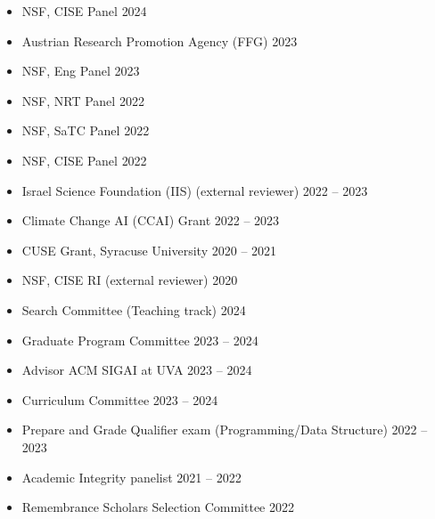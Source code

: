 \begin{itemize}
  \item 
  NSF, CISE Panel \hfill {2024} %
  \item 
  Austrian Research Promotion Agency (FFG) \hfill {2023}
  \item 
  NSF, Eng Panel \hfill {2023}
  \item 
  NSF, NRT Panel \hfill {2022}
  \item 
  NSF, SaTC Panel \hfill {2022} %
  \item 
  NSF, CISE Panel \hfill {2022} %
  \item 
  Israel Science Foundation (IIS) (external reviewer) \hfill {2022 -- 2023}
  \item 
  Climate Change AI (CCAI) Grant \hfill {2022 -- 2023}
  \item 
  CUSE Grant, Syracuse University \hfill {2020 -- 2021}
  \item 
  NSF, CISE RI (external reviewer) \hfill {2020}
\end{itemize}

  \begin{itemize}
    \item Search Committee (Teaching track) \hfill 2024
    \item Graduate Program Committee \hfill 2023 -- 2024
    \item Advisor ACM SIGAI at UVA  \hfill 2023 -- 2024
  \end{itemize}

  \begin{itemize}
    \item Curriculum Committee \hfill 2023 -- 2024
    \item Prepare and Grade Qualifier exam (Programming/Data Structure) \hfill 2022 -- 2023
    \item Academic Integrity panelist \hfill 2021 -- 2022
    \item Remembrance Scholars Selection Committee \hfill 2022
  \end{itemize}